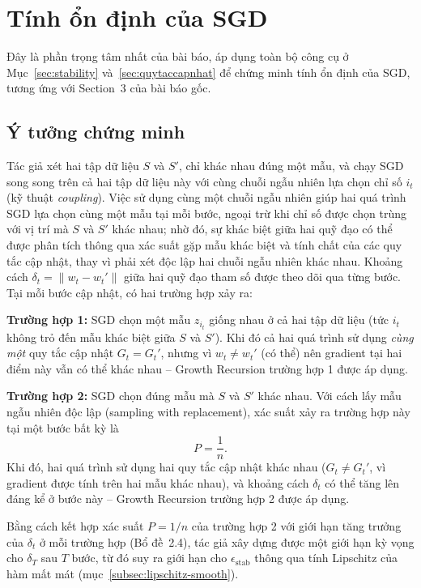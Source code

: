 \section{Tính ổn định của SGD}
\label{sec:stability-sgd}

Đây là phần trọng tâm nhất của bài báo, áp dụng toàn bộ công cụ ở Mục~\ref{sec:stability} và~\ref{sec:quytaccapnhat} để chứng minh tính ổn định của SGD, tương ứng với Section~3 của bài báo gốc.

\subsection{Ý tưởng chứng minh}
\label{subsec:yydungminh}

Tác giả xét hai tập dữ liệu $S$ và $S'$, chỉ khác nhau đúng một mẫu, và chạy SGD song song trên cả hai tập dữ liệu này với cùng chuỗi ngẫu nhiên lựa chọn chỉ số $i_t$ (kỹ thuật \textit{coupling}). Việc sử dụng cùng một chuỗi ngẫu nhiên giúp hai quá trình SGD lựa chọn cùng một mẫu tại mỗi bước, ngoại trừ khi chỉ số được chọn trùng với vị trí mà $S$ và $S'$ khác nhau; nhờ đó, sự khác biệt giữa hai quỹ đạo có thể được phân tích thông qua xác suất gặp mẫu khác biệt và tính chất của các quy tắc cập nhật, thay vì phải xét độc lập hai chuỗi ngẫu nhiên khác nhau. Khoảng cách $\delta_t = \|w_t - w_t'\|$ giữa hai quỹ đạo tham số được theo dõi qua từng bước. Tại mỗi bước cập nhật, có hai trường hợp xảy ra:

\textbf{Trường hợp 1:} SGD chọn một mẫu $z_{i_t}$ giống nhau ở cả hai tập dữ liệu (tức $i_t$ không trỏ đến mẫu khác biệt giữa $S$ và $S'$). Khi đó cả hai quá trình sử dụng \emph{cùng một} quy tắc cập nhật $G_t = G_t'$, nhưng vì $w_t \ne w_t'$ (có thể) nên gradient tại hai điểm này vẫn có thể khác nhau -- Growth Recursion trường hợp 1 được áp dụng.

\textbf{Trường hợp 2:} SGD chọn đúng mẫu mà $S$ và $S'$ khác nhau. Với cách lấy mẫu ngẫu nhiên độc lập (sampling with replacement), xác suất xảy ra trường hợp này tại một bước bất kỳ là
\[
P = \frac{1}{n}.
\]
Khi đó, hai quá trình sử dụng hai quy tắc cập nhật khác nhau ($G_t \ne G_t'$, vì gradient được tính trên hai mẫu khác nhau), và khoảng cách $\delta_t$ có thể tăng lên đáng kể ở bước này -- Growth Recursion trường hợp 2 được áp dụng.

Bằng cách kết hợp xác suất $P = 1/n$ của trường hợp 2 với giới hạn tăng trưởng của $\delta_t$ ở mỗi trường hợp (Bổ đề~2.4), tác giả xây dựng được một giới hạn kỳ vọng cho $\delta_T$ sau $T$ bước, từ đó suy ra giới hạn cho $\epsilon_{\mathrm{stab}}$ thông qua tính Lipschitz của hàm mất mát (mục~\ref{subsec:lipschitz-smooth}).

